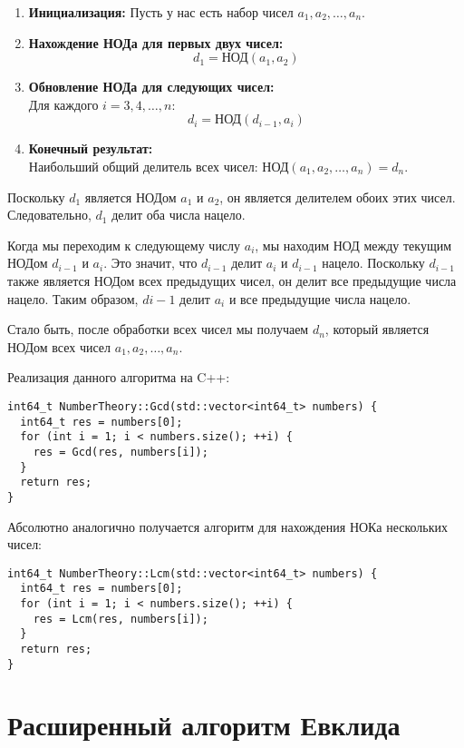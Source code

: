 \documentclass[12pt, a4paper, openany]{book}
\begin{document}
\begin{enumerate}
    \item \textbf{Инициализация:} Пусть у нас есть набор чисел \(a_1, a_2, \ldots, a_n\).
    \item \textbf{Нахождение НОДа для первых двух чисел:}
    \[ d_1 = \text{НОД}(a_1, a_2) \]
    \item \textbf{Обновление НОДа для следующих чисел:} \\
    Для каждого \(i = 3, 4, \ldots, n\):
    \[ d_i = \text{НОД}(d_{i-1}, a_i) \]
    \item \textbf{Конечный результат:} \\
    Наибольший общий делитель всех чисел: НОД\((a_1, a_2, \ldots, a_n) = d_n\).
\end{enumerate}

Поскольку $d_1$ является НОДом $a_1$ и $a_2$, он является делителем обоих этих чисел. Следовательно, $d_1$ делит оба числа нацело.

Когда мы переходим к следующему числу $a_i$, мы находим НОД между текущим НОДом $d_{i-1}$ и $a_i$. Это значит, что $d_{i-1}$ делит $a_i$ и $d_{i-1}$ нацело. Поскольку $d_{i-1}$ также является НОДом всех предыдущих чисел, он делит все предыдущие числа нацело. Таким образом, $d{i-1}$ делит $a_i$ и все предыдущие числа нацело.

Стало быть, после обработки всех чисел мы получаем $d_n$, который является НОДом всех чисел $a_1, a_2, …,a_n$.

\newpage
\noindent
Реализация данного алгоритма на C++:

\begin{lstlisting}
int64_t NumberTheory::Gcd(std::vector<int64_t> numbers) {
  int64_t res = numbers[0];
  for (int i = 1; i < numbers.size(); ++i) {
    res = Gcd(res, numbers[i]);
  }
  return res;
}
\end{lstlisting}

\noindent
Абсолютно аналогично получается алгоритм для нахождения НОКа нескольких чисел:

\begin{lstlisting}
int64_t NumberTheory::Lcm(std::vector<int64_t> numbers) {
  int64_t res = numbers[0];
  for (int i = 1; i < numbers.size(); ++i) {
    res = Lcm(res, numbers[i]);
  }
  return res;
}
\end{lstlisting}

\section{Расширенный алгоритм Евклида}
\end{document}
